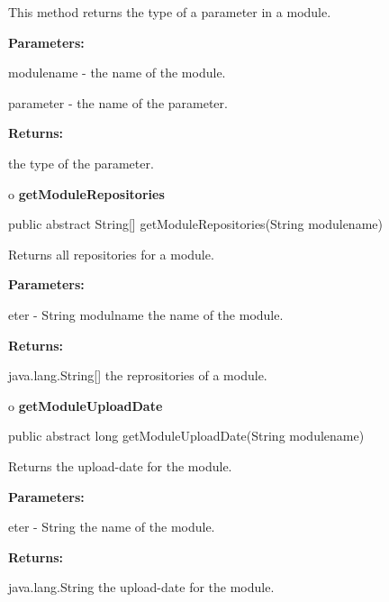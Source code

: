 \begin{description}
\htmlDD This method returns the type of a parameter in a module. 

\begin{description}
\item {\bf Parameters:}  

modulename - the name of the module.  

parameter - the name of the parameter.  
\item {\bf Returns:}  

the type of the parameter.  
\end{description}

\end{description}

o {\bf getModuleRepositories} 

\begin{PRE}
 public abstract String[] getModuleRepositories(String modulename)
\end{PRE}

\begin{description}
\htmlDD Returns all repositories for a module. 

\begin{description}
\item {\bf Parameters:}  

eter - String modulname the name of the module.  
\item {\bf Returns:}  

java.lang.String[] the reprositories of a module.  
\end{description}

\end{description}

o {\bf getModuleUploadDate} 

\begin{PRE}
 public abstract long getModuleUploadDate(String modulename)
\end{PRE}

\begin{description}
\htmlDD Returns the upload-date for the module. 

\begin{description}
\item {\bf Parameters:}  

eter - String the name of the module.  
\item {\bf Returns:}  

java.lang.String the upload-date for the module.  
\end{description}

\end{description}

